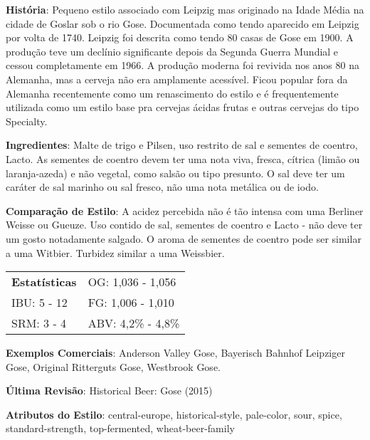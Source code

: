 \textbf{História}: Pequeno estilo associado com Leipzig mas originado na Idade Média na cidade de Goslar sob o rio Gose. Documentada como tendo aparecido em Leipzig por volta de 1740. Leipzig foi descrita como tendo 80 casas de Gose em 1900. A produção teve um declínio significante depois da Segunda Guerra Mundial e cessou completamente em 1966. A produção moderna foi revivida nos anos 80 na Alemanha, mas a cerveja não era amplamente acessível. Ficou popular fora da Alemanha recentemente como um renascimento do estilo e é frequentemente utilizada como um estilo base pra cervejas ácidas frutas e outras cervejas do tipo Specialty.

\textbf{Ingredientes}: Malte de trigo e Pilsen, uso restrito de sal e sementes de coentro, Lacto. As sementes de coentro devem ter uma nota viva, fresca, cítrica (limão ou laranja-azeda) e não vegetal, como salsão ou tipo presunto. O sal deve ter um caráter de sal marinho ou sal fresco, não uma nota metálica ou de iodo.

\textbf{Comparação de Estilo}: A acidez percebida não é tão intensa com uma Berliner Weisse ou Gueuze. Uso contido de sal, sementes de coentro e Lacto - não deve ter um gosto notadamente salgado. O aroma de sementes de coentro pode ser similar a uma Witbier. Turbidez similar a uma Weissbier.

\begin{tabular}{@{}p{35mm}p{35mm}@{}}
  \textbf{Estatísticas} & OG: 1,036 - 1,056 \\
  IBU: 5 - 12  & FG: 1,006 - 1,010  \\
  SRM: 3 - 4  & ABV: 4,2\% - 4,8\%
\end{tabular}

\textbf{Exemplos Comerciais}: Anderson Valley Gose, Bayerisch Bahnhof Leipziger Gose, Original Ritterguts Gose, Westbrook Gose.

\textbf{Última Revisão}: Historical Beer: Gose (2015)

\textbf{Atributos do Estilo}: central-europe, historical-style, pale-color, sour, spice, standard-strength, top-fermented, wheat-beer-family
